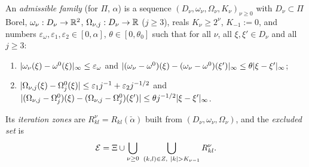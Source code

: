 \begin{definition}\label{bpW:w7:family}
An \emph{admissible family} (for $\Pi$, $\alpha$) is a sequence $(D_\nu,\omega_\nu,\Omega_\nu,K_\nu)_{\nu\ge0}$ with
$D_\nu\subset\Pi$ Borel, $\omega_\nu:D_\nu\to\mathbb{R}^2$, $\Omega_{\nu,j}:D_\nu\to\mathbb{R}$ ($j\ge3$), reals $K_\nu\ge2^\nu$,
$K_{-1}:=0$, and numbers $\varepsilon_\omega,\varepsilon_1,\varepsilon_2\in[0,\alpha]$, $\theta\in[0,\theta_0]$
such that for all $\nu$, all $\xi,\xi'\in D_\nu$ and all $j\ge3$:
\begin{enumerate}[label=(H\arabic*)]
\item $\lvert \omega_\nu(\xi)-\omega^0(\xi)\rvert_\infty\le\varepsilon_\omega$ and
  $\lvert (\omega_\nu-\omega^0)(\xi)-(\omega_\nu-\omega^0)(\xi')\rvert_\infty\le\theta\lvert \xi-\xi'\rvert_\infty$;
\item $\lvert \Omega_{\nu,j}(\xi)-\Omega^0_j(\xi)\rvert\le\varepsilon_1j^{-1}+\varepsilon_2j^{-1/2}$ and
  $\lvert (\Omega_{\nu,j}-\Omega^0_j)(\xi)-(\Omega_{\nu,j}-\Omega^0_j)(\xi')\rvert\le\theta j^{-1/2}\lvert \xi-\xi'\rvert_\infty$.
\end{enumerate}
Its \emph{iteration zones} are $R^\nu_{kl}=R_{kl}(\check\alpha)$ built from $(D_\nu,\omega_\nu,\Omega_\nu)$, and the
\emph{excluded set} is
\[\mathcal E=\Xi\cup\bigcup_{\nu\ge0}\ \bigcup_{(k,l)\in Z,\ \lvert k\rvert>K_{\nu-1}}R^\nu_{kl}.\]
\end{definition}

